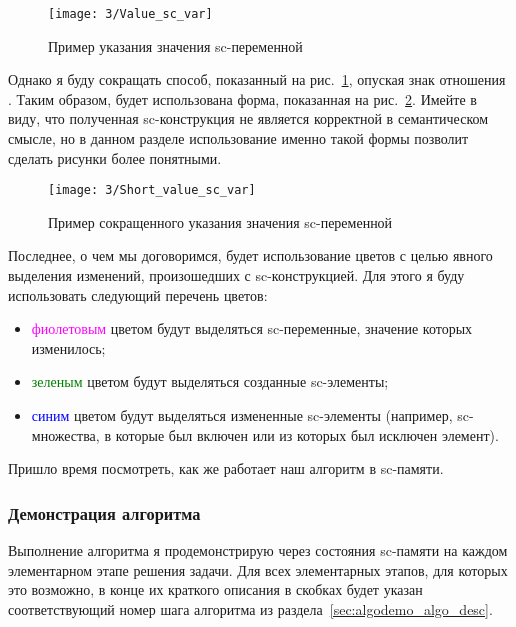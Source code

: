\begin{figure}[h!]
  \centering
  \texttt{[image: 3/Value\_sc\_var]}
  \caption{Пример указания значения sc-переменной }
  \label{fig:Value_sc_var}
\end{figure}

Однако я буду сокращать способ, показанный на
рис.~\ref{fig:Value_sc_var}, опуская знак отношения
. Таким образом, будет использована форма, показанная на
рис.~\ref{fig:Short_value_sc_var}. Имейте в виду, что полученная
sc-конструкция не является корректной в семантическом смысле, но в
данном разделе использование именно такой формы позволит сделать
рисунки более понятными.

\begin{figure}[h!]
  \centering
  \texttt{[image: 3/Short\_value\_sc\_var]}
  \caption{Пример сокращенного указания значения sc-переменной
    }
  \label{fig:Short_value_sc_var}
\end{figure}

Последнее, о чем мы договоримся, будет использование цветов с целью
явного выделения изменений, произошедших с sc-конструкцией. Для этого
я буду использовать следующий перечень цветов:

\begin{itemize}
\item \textcolor{magenta}{фиолетовым} цветом будут выделяться sc-переменные, значение
  которых изменилось;
\item \textcolor{green}{зеленым} цветом будут выделяться созданные sc-элементы;
\item \textcolor{blue}{синим} цветом будут выделяться измененные sc-элементы (например,
  sc-множества, в которые был включен или из которых был исключен
  элемент).
\end{itemize}

Пришло время посмотреть, как же работает наш алгоритм в sc-памяти.

\subsubsection{Демонстрация алгоритма}
\label{sec:algodemo_demo}

Выполнение алгоритма я продемонстрирую через состояния sc-памяти на
каждом элементарном этапе решения задачи. Для всех элементарных
этапов, для которых это возможно, в конце их краткого описания в
скобках будет указан соответствующий номер шага алгоритма из
раздела~\ref{sec:algodemo_algo_desc}.


